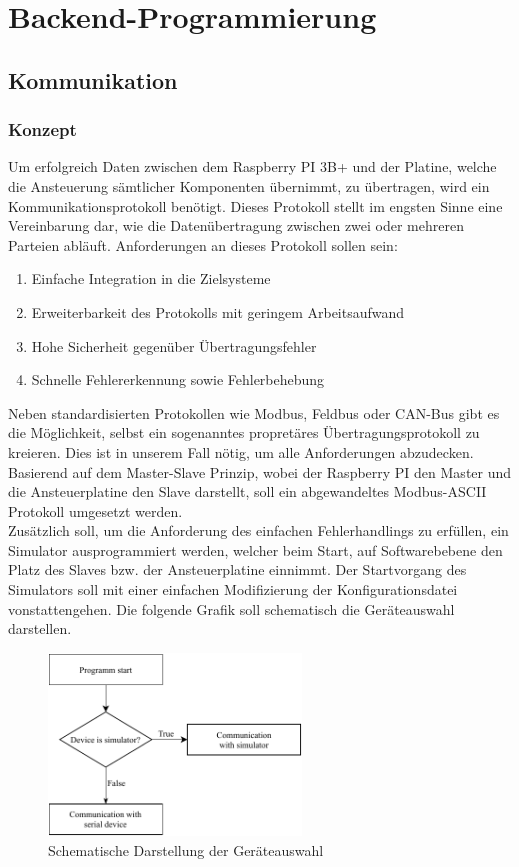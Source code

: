 \section{Backend-Programmierung}\label{sec:backend-programmierung}
\subsection{Kommunikation}\label{subsec:kommunikation}
\subsubsection{Konzept}
Um erfolgreich Daten zwischen dem Raspberry PI 3B+ und der Platine, welche die Ansteuerung sämtlicher Komponenten übernimmt, zu übertragen, wird ein Kommunikationsprotokoll benötigt.
Dieses Protokoll stellt im engsten Sinne eine Vereinbarung dar, wie die Datenübertragung zwischen zwei oder mehreren Parteien abläuft.
Anforderungen an dieses Protokoll sollen sein:
\begin{enumerate}
    \item Einfache Integration in die Zielsysteme
    \item Erweiterbarkeit des Protokolls mit geringem Arbeitsaufwand
    \item Hohe Sicherheit gegenüber Übertragungsfehler
    \item Schnelle Fehlererkennung sowie Fehlerbehebung
\end{enumerate}
Neben standardisierten Protokollen wie Modbus, Feldbus oder CAN-Bus gibt es die Möglichkeit, selbst ein sogenanntes propretäres Übertragungsprotokoll zu kreieren.
Dies ist in unserem Fall nötig, um alle Anforderungen abzudecken.
Basierend auf dem Master-Slave Prinzip, wobei der Raspberry PI den Master und die Ansteuerplatine den Slave darstellt, soll ein abgewandeltes Modbus-ASCII Protokoll umgesetzt werden.\\
Zusätzlich soll, um die Anforderung des einfachen Fehlerhandlings zu erfüllen, ein Simulator ausprogrammiert werden, welcher beim Start, auf Softwarebebene den Platz des Slaves bzw. der Ansteuerplatine einnimmt.
Der Startvorgang des Simulators soll mit einer einfachen Modifizierung der Konfigurationsdatei vonstattengehen.
Die folgende Grafik soll schematisch die Geräteauswahl darstellen.
\begin{figure}[H]
    \centering
    \includegraphics[width=0.6\textwidth]{fig/ainf/DeviceSelection}
    \caption{Schematische Darstellung der Geräteauswahl}
    \label{deviceSelection}
\end{figure}
